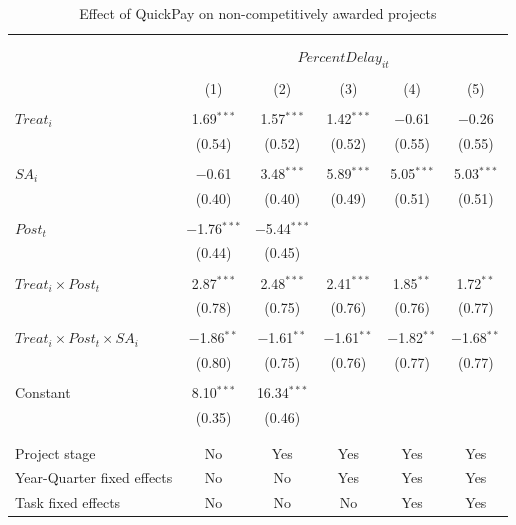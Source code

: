 \documentclass[
]{article}
\begin{document}
\begin{table}[H] \centering 
  \caption{Effect of QuickPay on non-competitively awarded projects} 
  \label{} 
\small 
\begin{tabular}{@{\extracolsep{-2pt}}lccccc} 
\\[-1.8ex]\hline 
\hline \\[-1.8ex] 
\\[-1.8ex] & \multicolumn{5}{c}{$PercentDelay_{it}$  } \\ 
\\[-1.8ex] & (1) & (2) & (3) & (4) & (5)\\ 
\hline \\[-1.8ex] 
 $Treat_i$ & 1.69$^{***}$ & 1.57$^{***}$ & 1.42$^{***}$ & $-$0.61 & $-$0.26 \\ 
  & (0.54) & (0.52) & (0.52) & (0.55) & (0.55) \\ 
  & & & & & \\ 
 $SA_i$ & $-$0.61 & 3.48$^{***}$ & 5.89$^{***}$ & 5.05$^{***}$ & 5.03$^{***}$ \\ 
  & (0.40) & (0.40) & (0.49) & (0.51) & (0.51) \\ 
  & & & & & \\ 
 $Post_t$ & $-$1.76$^{***}$ & $-$5.44$^{***}$ &  &  &  \\ 
  & (0.44) & (0.45) &  &  &  \\ 
  & & & & & \\ 
 $Treat_i \times Post_t$ & 2.87$^{***}$ & 2.48$^{***}$ & 2.41$^{***}$ & 1.85$^{**}$ & 1.72$^{**}$ \\ 
  & (0.78) & (0.75) & (0.76) & (0.76) & (0.77) \\ 
  & & & & & \\ 
 $Treat_i \times Post_t \times SA_i $ & $-$1.86$^{**}$ & $-$1.61$^{**}$ & $-$1.61$^{**}$ & $-$1.82$^{**}$ & $-$1.68$^{**}$ \\ 
  & (0.80) & (0.75) & (0.76) & (0.77) & (0.77) \\ 
  & & & & & \\ 
 Constant & 8.10$^{***}$ & 16.34$^{***}$ &  &  &  \\ 
  & (0.35) & (0.46) &  &  &  \\ 
  & & & & & \\ 
\hline \\[-1.8ex] 
Project stage & No & Yes & Yes & Yes & Yes \\ 
Year-Quarter fixed effects & No & No & Yes & Yes & Yes \\ 
Task fixed effects & No & No & No & Yes & Yes \\ 

\end{tabular}
\end{table}
\end{document}
